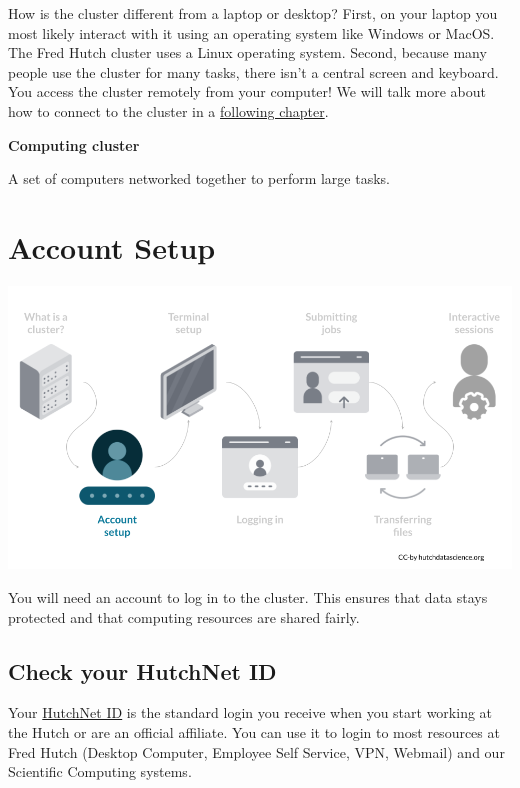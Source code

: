 \documentclass[
]{book}
\begin{document}
How is the cluster different from a laptop or desktop? First, on your laptop you most likely interact with it using an operating system like Windows or MacOS. The Fred Hutch cluster uses a Linux operating system. Second, because many people use the cluster for many tasks, there isn't a central screen and keyboard. You access the cluster remotely from your computer! We will talk more about how to connect to the cluster in a \protect\hyperlink{terminal}{following chapter}.

\textbf{Computing cluster}

A set of computers networked together to perform large tasks.

\hypertarget{account-setup}{%
\chapter{Account Setup}\label{account-setup}}

\begin{center}\includegraphics[width=0.8\linewidth]{resources/images/02-accounts_files/figure-latex//1BQxrVYdKZTbpCaF-i_q9w7s9x034lEXpQZDU-Sl09cs_gff2211b72f_1_160} \end{center}

You will need an account to log in to the cluster. This ensures that data stays protected and that computing resources are shared fairly.

\hypertarget{check-your-hutchnet-id}{%
\section{Check your HutchNet ID}\label{check-your-hutchnet-id}}

Your \href{https://centernet.fredhutch.org/cn/u/center-it/help-desk.html}{HutchNet ID} is the standard login you receive when you start working at the Hutch or are an official affiliate. You can use it to login to most resources at Fred Hutch (Desktop Computer, Employee Self Service, VPN, Webmail) and our Scientific Computing systems.
\end{document}
